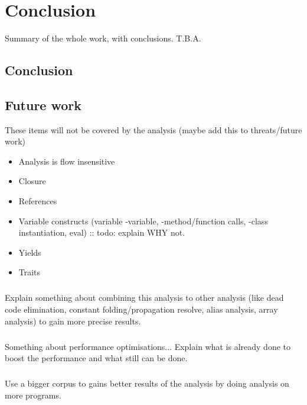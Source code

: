 \documentclass[main.tex]{subfiles}
\begin{document}
    \chapter{Conclusion}\label{ch:conclusion}
    Summary of the whole work, with conclusions. T.B.A.
    
    \section{Conclusion}
    
    \section{Future work}
    These items will not be covered by the analysis (maybe add this to threats/future work)
    \begin{itemize}
        \item Analysis is flow insensitive
        \item Closure
        \item References
        \item Variable constructs (variable -variable, -method/function calls, -class instantiation, eval) :: todo: explain WHY not.
        \item Yields
        \item Traits
    \end{itemize}

    
    \paragraph{}
    Explain something about combining this analysis to other analysis (like dead code elimination, constant folding/propagation resolve, alias analysis, array analysis) to gain more precise results.
    
    \paragraph{}
    Something about performance optimisations... Explain what is already done to boost the performance and what still can be done.
        
    \paragraph{}
    Use a bigger corpus to gains better results of the analysis by doing analysis on more programs.
    
\end{document}
